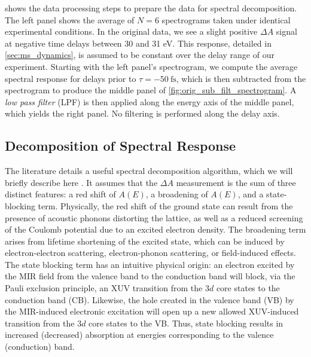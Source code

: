  shows the data processing steps to prepare the data for spectral decomposition. The left panel shows the average of $N=6$ spectrograms taken under identical experimental conditions. In the original data, we see a slight positive $\Delta A$ signal at negative time delays between 30 and 31 eV. This response, detailed in \cref{sec:ms_dynamics}, is assumed to be constant over the delay range of our experiment. Starting with the left panel's spectrogram, we compute the average spectral response for delays prior to $\tau = -50 \ \textrm{fs}$, which is then subtracted from the spectrogram to produce the middle panel of \cref{fig:orig_sub_filt_spectrogram}. A \textit{low pass filter} (LPF) is then applied along the energy axis of the middle panel, which yields the right panel. No filtering is performed along the delay axis.

\subsection{Decomposition of Spectral Response}
\label{sec:spectral_decomposition}

The literature details a useful spectral decomposition algorithm, which we will briefly describe here \cite{zurchDirectSimultaneousObservation2017}. It assumes that the $\Delta A$ measurement is the sum of three distinct features: a red shift of $A(E)$, a broadening of $A(E)$, and a state-blocking term. Physically, the red shift of the ground state can result from the presence of acoustic phonons distorting the lattice, as well as a reduced screening of the Coulomb potential due to an excited electron density. The broadening term arises from lifetime shortening of the excited state, which can be induced by electron-electron scattering, electron-phonon scattering, or field-induced effects. The state blocking term has an intuitive physical origin: an electron excited by the MIR field from the valence band to the conduction band will block, via the Pauli exclusion principle, an XUV transition from the $3d$ core states to the conduction band (CB). Likewise, the hole created in the valence band (VB) by the MIR-induced electronic excitation will open up a new allowed XUV-induced transition from the $3d$ core states to the VB. Thus, state blocking results in increased (decreased) absorption at energies corresponding to the valence (conduction) band.

